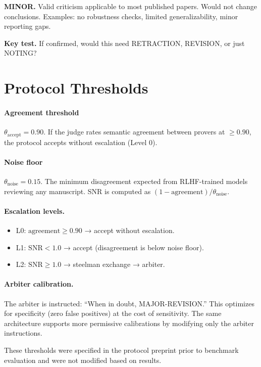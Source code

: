 \documentclass[11pt]{article}
\theoremstyle{definition}
\begin{document}
\medskip
\noindent\textbf{MINOR.} Valid criticism applicable to most published papers. Would not change conclusions. Examples: no robustness checks, limited generalizability, minor reporting gaps.

\medskip
\noindent\textbf{Key test.} If confirmed, would this need RETRACTION, REVISION, or just NOTING?

\section{Protocol Thresholds}
\label{app:thresholds}

\paragraph{Agreement threshold} $\theta_{\mathrm{accept}} = 0.90$. If the judge rates semantic agreement between provers at $\geq 0.90$, the protocol accepts without escalation (Level $0$).

\paragraph{Noise floor} $\theta_{\mathrm{noise}} = 0.15$. The minimum disagreement expected from RLHF-trained models reviewing any manuscript. SNR is computed as $(1 - \mathrm{agreement}) / \theta_{\mathrm{noise}}$.

\paragraph{Escalation levels.}
\begin{itemize}[nosep]
\item L0: $\mathrm{agreement} \geq 0.90$ → accept without escalation.
\item L1: $\mathrm{SNR} < 1.0$ → accept (disagreement is below noise floor).
\item L2: $\mathrm{SNR} \geq 1.0$ → steelman exchange → arbiter.
\end{itemize}

\paragraph{Arbiter calibration.} The arbiter is instructed: ``When in doubt, MAJOR-REVISION.'' This optimizes for specificity (zero false positives) at the cost of sensitivity. The same architecture supports more permissive calibrations by modifying only the arbiter instructions.

These thresholds were specified in the protocol preprint prior to benchmark evaluation and were not modified based on results.



\end{document}
